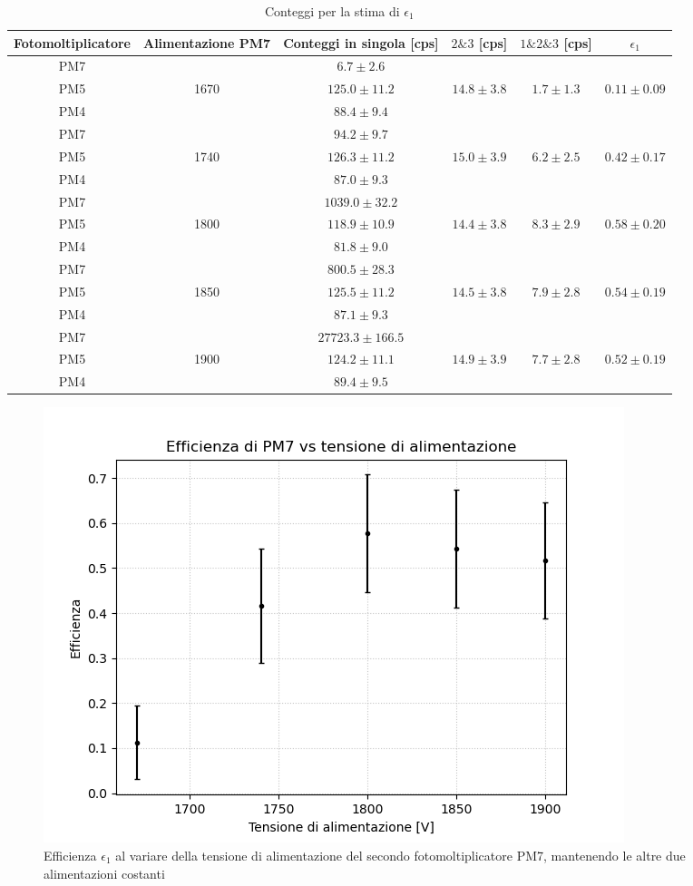 \documentclass{article}
\begin{document}
\begin{table}[H]
\centering
\begin{tabular}{|c|c|c|c|c|c|}
\hline
Fotomoltiplicatore & Alimentazione PM7 & Conteggi in singola [cps] & $2 \& 3$  [cps]&  $1\&2\& 3$ [cps]& $\epsilon_1$\\ 
 \hline
\hline 
PM7 & & $6.7 \pm 2.6$ &  & &\\ 
PM5 & 1670 & $125.0 \pm 11.2$ & $14.8 \pm 3.8$  & $1.7 \pm 1.3$ & $0.11 \pm 0.09$\\ 
PM4 & & $88.4 \pm 9.4$ &  & &\\ 
\hline 
PM7 & & $94.2 \pm 9.7$ &  & &\\ 
PM5 & 1740 & $126.3 \pm 11.2$ & $15.0 \pm 3.9$  & $6.2 \pm 2.5$ & $0.42 \pm 0.17$\\ 
PM4 & & $87.0 \pm 9.3$ &  & &\\ 
\hline 
PM7 & & $1039.0 \pm 32.2$ &  & &\\ 
PM5 & 1800 & $118.9 \pm 10.9$ & $14.4 \pm 3.8$  & $8.3 \pm 2.9$ & $0.58 \pm 0.20$\\ 
PM4 & & $81.8 \pm 9.0$ &  & &\\ 
\hline 
PM7 & & $800.5 \pm 28.3$ &  & &\\ 
PM5 & 1850 & $125.5 \pm 11.2$ & $14.5 \pm 3.8$  & $7.9 \pm 2.8$ & $0.54 \pm 0.19$\\ 
PM4 & & $87.1 \pm 9.3$ &  & &\\ 
\hline 
PM7 & & $27723.3 \pm 166.5$ &  & &\\ 
PM5 & 1900 & $124.2 \pm 11.1$ & $14.9 \pm 3.9$  & $7.7 \pm 2.8$ & $0.52 \pm 0.19$\\ 
PM4 & & $89.4 \pm 9.5$ &  & &\\ 
\hline
\end{tabular}
\caption{Conteggi per la stima di $\epsilon_1$}\label{tabepsilon1}
\end{table}

\begin{figure}[h!]
\begin{center}
\includegraphics[scale=0.7]{Grafici/epsilon_vs_alimentazione_PM7.png}
\caption{Efficienza $\epsilon_1$ al variare della tensione di alimentazione del secondo fotomoltiplicatore PM7, mantenendo le altre due alimentazioni costanti} \label{fepsilon1}
\end{center}
\end{figure}
\end{document}
